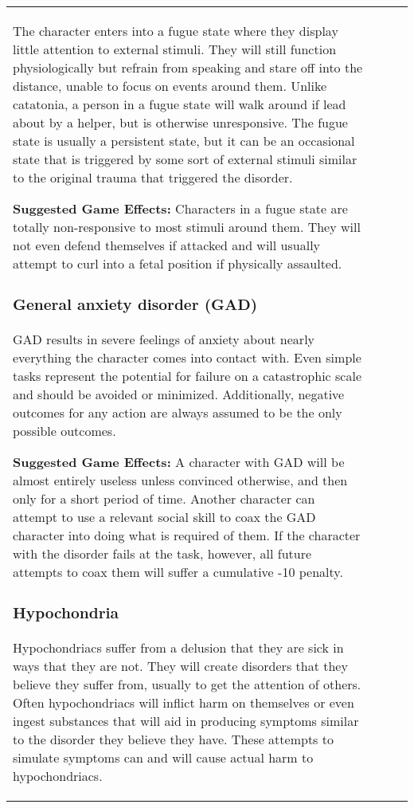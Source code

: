 \begin{table}
\begin{tabular}{|p{8cm}|r|r|r|}
The character enters into a fugue state where they display little attention to external stimuli. They will still function physiologically but refrain from speaking and stare off into the distance, unable to focus on events around them. Unlike catatonia, a person in a fugue state will walk around if lead about by a helper, but is otherwise unresponsive. The fugue state is usually a persistent state, but it can be an occasional state that is triggered by some sort of external stimuli similar to the original trauma that triggered the disorder. 

\textbf{Suggested Game Effects:} Characters in a fugue state are totally non-responsive to most stimuli around them. They will not even defend themselves if attacked and will usually attempt to curl into a fetal position if physically assaulted. 

\subsubsection{General anxiety disorder (GAD)} 

GAD results in severe feelings of anxiety about nearly everything the character comes into contact with. Even simple tasks represent the potential for failure on a catastrophic scale and should be avoided or minimized. Additionally, negative outcomes for any action are always assumed to be the only possible outcomes. 

\textbf{Suggested Game Effects:} A character with GAD will be almost entirely useless unless convinced otherwise, and then only for a short period of time. Another character can attempt to use a relevant social skill to coax the GAD character into doing what is required of them. If the character with the disorder fails at the task, however, all future attempts to coax them will suffer a cumulative -10 penalty. 

\subsubsection{Hypochondria} 

Hypochondriacs suffer from a delusion that they are sick in ways that they are not. They will create disorders that they believe they suffer from, usually to get the attention of others. Often hypochondriacs will inflict harm on themselves or even ingest substances that will aid in producing symptoms similar to the disorder they believe they have. These attempts to simulate symptoms can and will cause actual harm to hypochondriacs. 


\end{tabular}
\end{table}
